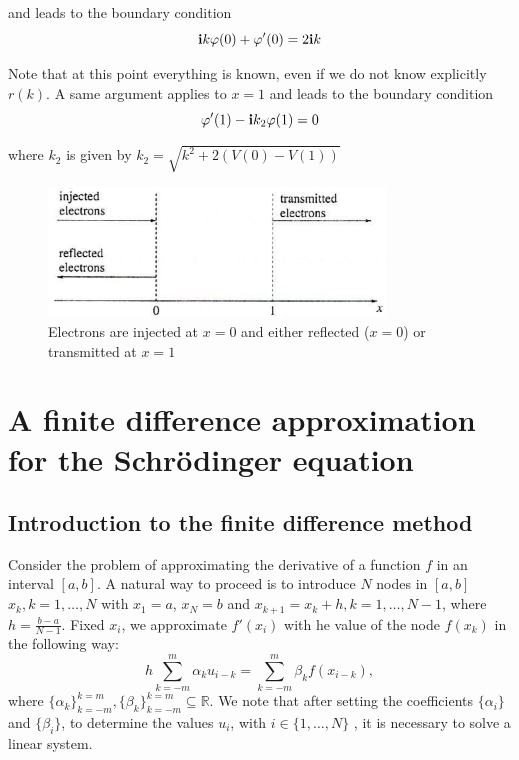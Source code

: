 \documentclass[12pt,a4paper,onecolumn]{article}
\theoremstyle{definition}
\theoremstyle{plain}
\newcommand{\var}{\varphi}
\newcommand{\numberset}{\mathbb}
\newcommand{\R}{\numberset{R}}
\begin{document}
and leads to the boundary condition 
\begin{equation}
\label{bordo1}
 \bold{i} k \var(0)+\var'(0)=2\bold{i}k
\end{equation}


Note that at this point everything is known, even if we do not know explicitly $r(k)$. A same argument applies to $x=1$ and leads to the boundary condition 
\begin{equation}
\label{bordo2}
\varphi'(1) - \bold{i} k_2\varphi(1)=0
\end{equation}

where $k_2$ is given by $k_2=\sqrt{k^2+2(V(0)-V(1))}$


\begin{figure}[h!]

	\centering
	  \includegraphics[width=0.8\textwidth]{regions.png}
	  \caption{Electrons are injected at $x=0$ and either reflected ($x=0$) or transmitted at $x=1$}
		\label{bdderiva}
\end{figure}




\section{A finite difference approximation for the Schr{\"o}dinger equation}
\subsection{Introduction to the finite difference method}
Consider the problem of approximating the derivative of a function $ f $ in an interval $ [a, b] $. A natural way to proceed is to introduce $N$ nodes in $ [a, b] $ $ x_k, k = 1, \dots, N $ with $ x_1 = a $, $ x_N = b $ and $ x_ {k + 1} = x_ {k} + h, k = 1, \dots, N-1 $, where $ h = \frac {b-a} {N-1} $.
Fixed $x_i$, we approximate $f'(x_i)$ with he value of the node $f(x_k)$ in the following way:
\begin{equation}
\label{eqn:somme}
h\sum_{k=-m}^{m}\alpha_{k}u_{i-k} = \sum_{k=-m}^{m} \beta_{k}f(x_{i-k}),
\end{equation}
where $\{\alpha_k\}_{k=-m}^{k=m}, \{\beta_{k}\}_{k=-m}^{k=m} \subseteq \R$.
We note that after setting the coefficients $\{\alpha_i\}$ and $\{\beta_i\}$, to determine the values $u_i$, with $i\in\{1,\dots,N\}$ , it is necessary to solve a linear system. 
\end{document}
